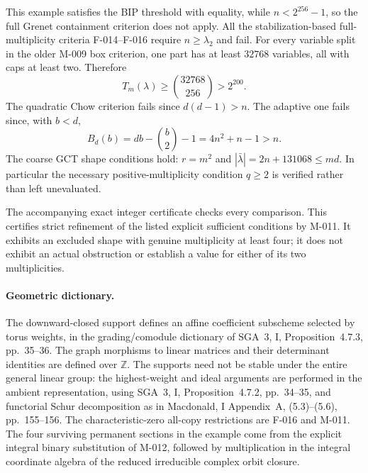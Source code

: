 This example satisfies the BIP threshold with equality, while
$n<2^{256}-1$, so the full Grenet containment criterion does
not apply. All the stabilization-based full-multiplicity
criteria F-014--F-016 require $n\geq\lambda_2$ and fail.
For every variable split in the older M-009 box criterion,
one part has at least $32768$ variables, all with caps at
least two. Therefore
\[
                 T_m(\lambda)\geq\binom{32768}{256}>2^{200}.
\]
The quadratic Chow criterion fails since $d(d-1)>n$.
The adaptive one fails since, with $b<d$,
\[
                    B_d(b)=db-\binom b2-1
                                =4n^2+n-1>n.
\]
The coarse GCT shape conditions hold: $r=m^2$ and
$|\bar\lambda|=2n+131068\leq md$. In particular the
necessary positive-multiplicity condition $q\geq2$ is
verified rather than left unevaluated.

The accompanying exact integer certificate checks every
comparison. This certifies strict refinement of the listed
explicit sufficient conditions by M-011. It exhibits an
excluded shape with genuine multiplicity at least four; it
does not exhibit an actual obstruction or establish a value
for either of its two multiplicities.

\paragraph{Geometric dictionary.}
The downward-closed support defines an affine coefficient
subscheme selected by torus weights, in the grading/comodule
dictionary of SGA~3, I, Proposition~4.7.3, pp.~35--36.
The graph morphisms to linear matrices and their determinant
identities are defined over $\mathbb Z$. The supports need
not be stable under the entire general linear group: the
highest-weight and ideal arguments are performed in the
ambient representation, using SGA~3, I, Proposition~4.7.2,
pp.~34--35, and functorial Schur decomposition as in
Macdonald, I Appendix~A, (5.3)--(5.6), pp.~155--156.
The characteristic-zero all-copy restrictions are F-016 and
M-011. The four surviving permanent sections in the example
come from the explicit integral binary substitution of M-012,
followed by multiplication in the integral coordinate algebra
of the reduced irreducible complex orbit closure.
